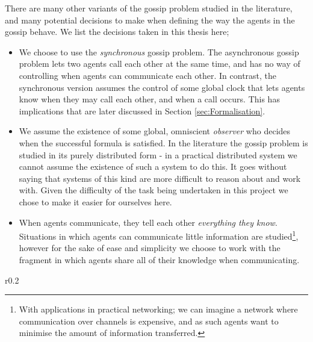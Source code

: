 \documentclass[ %
                    author={Leo Poulson},
                supervisor={Dr. Steven Ramsay},
                    degree={BSc},
                     title={Epistemic Planning for the Dynamic Gossip problem},
                  subtitle={},
                      year={2019} ]{dissertation}
\begin{document}
There are many other variants of the gossip problem studied in the literature,
and many potential decisions to make when defining the way the agents in the
gossip behave. We list the decisions taken in this thesis here;

\begin{itemize}
  \setlength\itemsep{1em}
  \item We choose to use the \emph{synchronous} gossip problem. The asynchronous
    gossip problem lets two agents call each other at the same time, and has no
    way of controlling when agents can communicate each other. In contrast, the
    synchronous version assumes the control of some global clock that lets
    agents know when they may call each other, and when a call occurs. This has
    implications that are later discussed in Section \ref{sec:Formalisation}.
  \item We assume the existence of some global, omniscient \emph{observer} who
    decides when the successful formula is satisfied. In the literature the
    gossip problem is studied in its purely distributed form - in a practical
    distributed system we cannot assume the existence of such a system to do
    this. It goes without saying that systems of this kind are more difficult to
    reason about and work with. Given the difficulty of the task being
    undertaken in this project we chose to make it easier for ourselves here.
  \item When agents communicate, they tell each other \emph{everything they
      know}. Situations in which agents can communicate little information are
    studied\footnote{With applications in practical networking; we can imagine a
    network where communication over channels is expensive, and as such agents
    want to minimise the amount of information transferred.}, however for the
  sake of ease and simplicity we choose to work with the fragment in which
  agents share all of their knowledge when communicating. 
\end{itemize}

\begin{wrapfigure}{r}{0.2\textwidth}
  \centering
  \caption{}
  \label{fig:abacda}
\end{wrapfigure}
\end{document}
